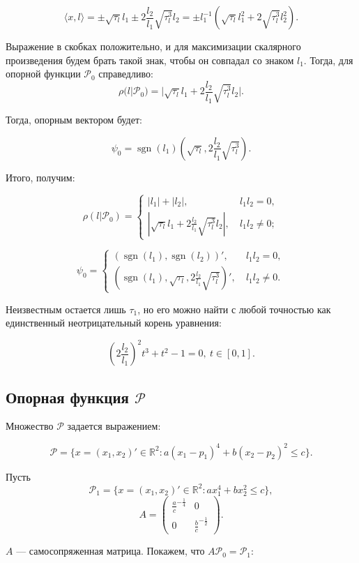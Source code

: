 \documentclass{article}
\theoremstyle{definition}
\newcommand{\sgn}{\mathop{\mathrm{sgn}}}
\begin{document}
$$\langle x,l \rangle = \pm \sqrt{\tau_l}l_1 \pm 2\frac{l_2}{l_1}\sqrt{\tau_l^3}l_2 = 
\pm l_1^{-1}(\sqrt{\tau_l}l_1^2+2\sqrt{\tau_l^3}l_2^2).$$

Выражение в скобках положительно, и для максимизации скалярного произведения будем брать такой 
знак, чтобы он совпадал со знаком $l_1$. Тогда, для опорной функции $\mathcal{P}_0$ 
справедливо: $$\rho(l|\mathcal{P}_0) = |\sqrt{\tau_l}l_1+2\frac{l_2}{l_1}\sqrt{\tau_l^3}l_2|.$$

Тогда, опорным вектором будет:

$$\psi_0 = \sgn(l_1)(\sqrt{\tau_l}, 2\frac{l_2}{l_1}\sqrt{\tau_l^3}).$$

Итого, получим:

\[
\rho(l|\mathcal{P}_0) = 
  \begin{cases}
    |l_1|+|l_2|,~ & l_1l_2 = 0, \\
    |\sqrt{\tau_l}l_1+2\frac{l_2}{l_1}\sqrt{\tau_l^3}l_2|,~ & l_1l_2 \neq 0;
  \end{cases}
\]

\[
\psi_0 = 
  \begin{cases}
    (\sgn(l_1), \sgn(l_2))',~ & l_1l_2 = 0,\\
    (\sgn(l_1), \sqrt{\tau_l}, 2\frac{l_2}{l_1}\sqrt{\tau_l^3})',~ & l_1l_2 \neq 0.
  \end{cases}
\]

Неизвестным остается лишь $\tau_1$, но его можно найти с любой точностью как единственный
неотрицательный корень уравнения:

$$(2\frac{l_2}{l_1})^2t^3+t^2-1 = 0,~ t \in [0,1].$$

\subsection{Опорная функция $\mathcal{P}$}

Множество $\mathcal{P}$ задается выражением:

$$\mathcal{P} = \{x = (x_1,x_2)' \in \mathbb{R}^2: a(x_1-p_1)^4+b(x_2-p_2)^2 \leqslant c\}.$$

Пусть $$\mathcal{P}_1 = \{x = (x_1,x_2)' \in \mathbb{R}^2: ax_1^4+bx_2^2 \leqslant c \},$$
$$A = \begin{pmatrix} \frac{a}{c}^{-\frac{1}{4}} & 0 \\ 0 & \frac{b}{c}^{-\frac{1}{2}} \end{pmatrix}.$$

$A$ --- самосопряженная матрица.
Покажем, что $A\mathcal{P}_0 = \mathcal{P}_1$:
\end{document}
